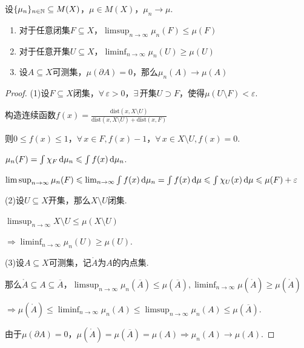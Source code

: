 \begin{lemma}{}
    设$\{\mu_n\}_{n\in\mathbb{N}}\subseteq M(X)$，$\mu\in M(X)$，$\mu_n\to\mu$.\par
    \begin{enumerate}[(1)]
        \item 对于任意闭集$F\subseteq X$，$\limsup_{n\to\infty}{\mu_n(F)}\leq \mu(F)$
        \item 对于任意开集$U\subseteq X$，$\liminf_{n\to\infty}{\mu_n(U)}\geq \mu(U)$
        \item 设$A\subseteq X$可测集，$\mu(\partial A)=0$，那么$\mu_n(A)\to\mu(A)$
    \end{enumerate}
\end{lemma}
\begin{proof}
    (1)设$F\subseteq X$闭集，$\forall\,\varepsilon>0$，$\exists\,$开集$U\supset F$，使得$\mu\left(U\setminus F\right)<\varepsilon$.\par
    构造连续函数$f(x)=\frac{\mathrm{dist}\left(x,X\setminus U\right)}{\mathrm{dist}\left(x,X\setminus U\right)+\mathrm{dist}\left(x,F\right)}$\par
    则$0\leq f(x)\leq 1$，$\forall\, x\in F,f(x)-1$，$\forall\, x\in X\setminus U,f(x)=0$.\par
    $\mu_n(F)=\int\chi_F\mathop{}\!\mathrm{d}\mu_n\leqslant\int{f(x)}\mathop{}\!\mathrm{d}\mu_n$.\par
    $\limsup_{n\to\infty}{\mu_n(F)}\leqslant\lim_{n\to\infty}\int{f(x)}\mathop{}\!\mathrm{d}\mu_n=\int{f(x)}\mathop{}\!\mathrm{d}\mu\leqslant\int{\chi_U(x)\mathop{}\!\mathrm{d}\mu}\leqslant \mu(F)+\varepsilon$\par
    (2)设$U\subseteq X$开集，那么$X\setminus U$闭集.\par
    $\limsup_{n\to\infty}{X\setminus U}\leq \mu\left(X\setminus U\right)$\par
    $\Rightarrow \liminf_{n\to\infty}{\mu_n(U)}\geq \mu(U)$.\par
    (3)设$A\subseteq X$可测集，记$\mathring{A}$为$A$的内点集.\par
    那么$\mathring{A}\subseteq A\subseteq\overline{A}$，$\limsup_{n\to\infty}\mu_n(\overline{A})\leq\mu(\overline{A}),\liminf_{n\to\infty}\mu\left(\mathring{A}\right)\geq\mu\left(\mathring{A}\right)$\par
    $\Rightarrow \mu\left(\mathring{A}\right)\leq\liminf_{n\to\infty}\mu_n(A)\leq\limsup_{n\to\infty}\mu_n(A)\leq\mu(\overline{A})$.\par
    由于$\mu(\partial A)=0$，$\mu\left(\mathring{A}\right)=\mu(\overline{A})=\mu(A)\Rightarrow \mu_n(A)\to\mu(A)$.
\end{proof}

